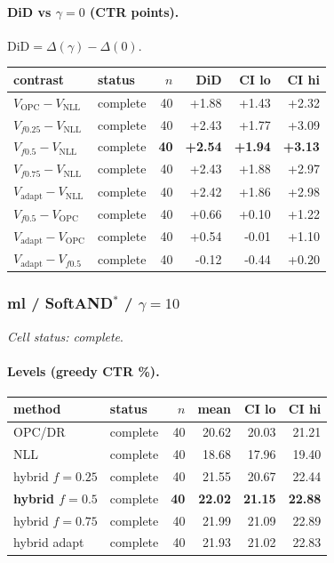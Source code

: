 \documentclass[10pt,a4paper]{article}
\begin{document}
\paragraph{DiD vs $\gamma=0$ (CTR points).} $\mathrm{DiD}=\Delta(\gamma)-\Delta(0)$.
{\centering\small\begin{tabular}{llrrrr}
\toprule contrast & status & $n$ & DiD & CI lo & CI hi \\
\midrule
$V_{\mathrm{OPC}}-V_{\mathrm{NLL}}$ & complete & 40 & +1.88 & +1.43 & +2.32 \\
$V_{f0.25}-V_{\mathrm{NLL}}$ & complete & 40 & +2.43 & +1.77 & +3.09 \\
\textbf{$V_{f0.5}-V_{\mathrm{NLL}}$} & complete & \textbf{40} & \textbf{+2.54} & \textbf{+1.94} & \textbf{+3.13} \\
$V_{f0.75}-V_{\mathrm{NLL}}$ & complete & 40 & +2.43 & +1.88 & +2.97 \\
$V_{\mathrm{adapt}}-V_{\mathrm{NLL}}$ & complete & 40 & +2.42 & +1.86 & +2.98 \\
$V_{f0.5}-V_{\mathrm{OPC}}$ & complete & 40 & +0.66 & +0.10 & +1.22 \\
$V_{\mathrm{adapt}}-V_{\mathrm{OPC}}$ & complete & 40 & +0.54 & -0.01 & +1.10 \\
$V_{\mathrm{adapt}}-V_{f0.5}$ & complete & 40 & -0.12 & -0.44 & +0.20 \\
\bottomrule\end{tabular}\par}
\bigskip
\subsubsection{ml / SoftAND$^*$ / $\gamma=10$}
\emph{Cell status: complete}.
\paragraph{Levels (greedy CTR \%).}
{\centering\small\begin{tabular}{llrrrr}
\toprule method & status & $n$ & mean & CI lo & CI hi \\
\midrule
OPC/DR & complete & 40 & 20.62 & 20.03 & 21.21 \\
NLL & complete & 40 & 18.68 & 17.96 & 19.40 \\
hybrid $f{=}0.25$ & complete & 40 & 21.55 & 20.67 & 22.44 \\
\textbf{hybrid $f{=}0.5$} & complete & \textbf{40} & \textbf{22.02} & \textbf{21.15} & \textbf{22.88} \\
hybrid $f{=}0.75$ & complete & 40 & 21.99 & 21.09 & 22.89 \\
hybrid adapt & complete & 40 & 21.93 & 21.02 & 22.83 \\
\bottomrule\end{tabular}\par}
\end{document}
